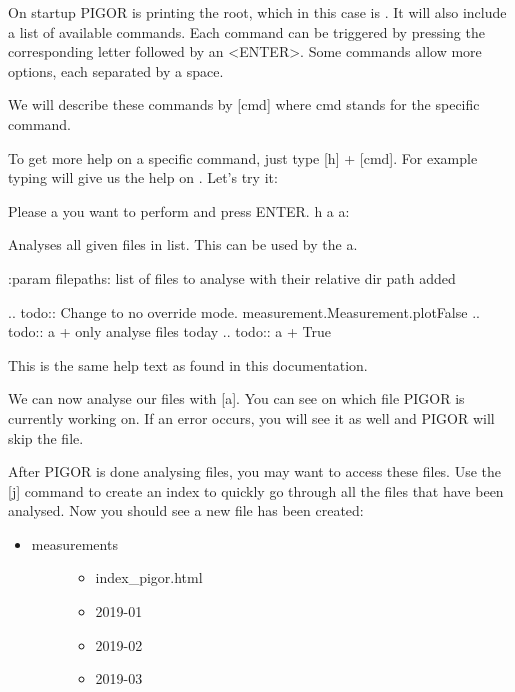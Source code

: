 \documentclass[letterpaper,10pt,english]{sphinxmanual}
\begin{document}
On startup PIGOR is printing the root, which in this case is . It will also include a list of available commands. Each command can be triggered by pressing the corresponding letter followed by an \textless{}ENTER\textgreater{}. Some commands allow more options, each separated by a space.

We will describe these commands by {[}cmd{]} where cmd stands for the specific command.

To get more help on a specific command, just type {[}h{]} + {[}cmd{]}. For example typing  will give us the help on . Let’s try it:

\begin{sphinxVerbatim}[commandchars=\\\{\}]
Please  a  you want to perform and press \PYGZlt{}ENTER\PYGZgt{}.
h a
a:

Analyses all given files in list. This  can be used by the  \PYG{o}{[}a\PYG{o}{]}.

    :param filepaths:   list of files to analyse with
                        their relative dir path added

    .. todo:: Change to no override mode. measurement.Measurement.plotFalse
    .. todo:: a +  \PYGZgt{} only analyse files  today
    .. todo:: a +  \PYGZgt{} True
\end{sphinxVerbatim}

This is the same help text as found in this documentation.

We can now analyse our files with {[}a{]}. You can see on which file PIGOR is currently working on. If an error occurs, you will see it as well and PIGOR will skip the file.

After PIGOR is done analysing files, you may want to access these files. Use the {[}j{]} command to create an index to quickly go through all the files that have been analysed. Now you should see a new file has been created:
\begin{itemize}
\item {} \begin{description}
\item[{measurements}] \leavevmode\begin{itemize}
\item {} 
index\_pigor.html

\item {} 
2019-01

\item {} 
2019-02

\item {} 
2019-03

\end{itemize}

\end{description}

\end{itemize}
\end{document}
